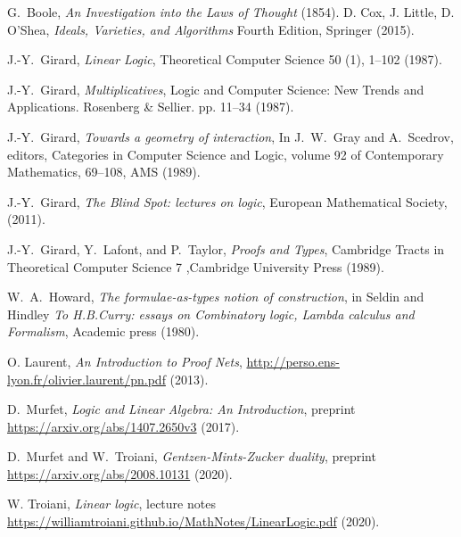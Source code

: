 \documentclass{beamer}
\theoremstyle{plain}
\theoremstyle{definition}
\begin{document}
\begin{frame}[allowframebreaks]
	\begin{thebibliography}{9}
		 G.~Boole, \textsl{An Investigation into the Laws of Thought} (1854).
		 D. Cox, J. Little, D. O'Shea, \emph{Ideals, Varieties, and Algorithms} Fourth Edition, Springer (2015).
		
		J.-Y.~Girard, \textsl{Linear Logic}, Theoretical Computer Science 50 (1), 1--102 (1987).
		
		 J.-Y.~Girard, \emph{Multiplicatives}, Logic and Computer Science: New Trends and Applications. Rosenberg \& Sellier. pp. 11–34 (1987).
		
		J.-Y.~Girard, \textsl{Towards a geometry of interaction}, In J.~W.~Gray and A.~Scedrov, editors, Categories in Computer Science and Logic, volume 92 of Contemporary Mathematics, 69--108, AMS (1989).
		
		J.-Y.~Girard, \textsl{The Blind Spot: lectures on logic}, European Mathematical Society, (2011).
		
		J.-Y.~Girard, Y.~Lafont, and P.~Taylor, \textsl{Proofs and Types}, Cambridge Tracts in Theoretical Computer Science 7 ,Cambridge University Press (1989).
		
		 W.~A.~Howard, \textsl{The formulae-as-types notion of construction}, in Seldin and Hindley \textsl{To H.B.Curry: essays on Combinatory logic, Lambda calculus and Formalism}, Academic press (1980).
		
		 O. Laurent, \emph{An Introduction to Proof Nets}, \url{http://perso.ens-lyon.fr/olivier.laurent/pn.pdf} (2013).
		
		D.~Murfet, \textsl{Logic and Linear Algebra: An Introduction}, preprint \url{https://arxiv.org/abs/1407.2650v3} (2017).
		
		 D.~Murfet and W.~Troiani, \textsl{{G}entzen-{M}ints-{Z}ucker duality}, preprint \url{https://arxiv.org/abs/2008.10131} (2020).
		
		 W. Troiani, \emph{Linear logic}, lecture notes \url{https://williamtroiani.github.io/MathNotes/LinearLogic.pdf} (2020).
		\end{thebibliography}
	\end{frame}
	
\end{document}

